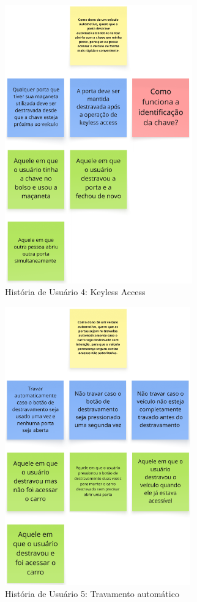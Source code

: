 \begin{figure}[ht]
\centering
\includegraphics[height=12cm]{figuras/user_story_4.png}
\caption{História de Usuário 4: Keyless Access}
\end{figure}

\begin{figure}[ht]
\centering
\includegraphics[height=12cm]{figuras/user_story_5.png}
\caption{História de Usuário 5: Travamento automático}
\end{figure}

